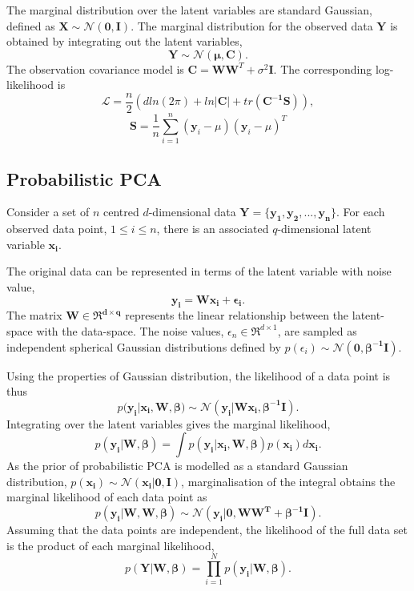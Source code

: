 \documentclass[ %
                    author={Dillon Keith Diep},
                supervisor={Dr. Carl Henrik Ek},
                    degree={MEng},
                     title={Assisted Content Generation for 3D Hair Geometry},
                  subtitle={[INCOMPLETE DRAFT, NOT FOR SUBMISSION]},
                      type={Research},
                      year={2014} ]{dissertation}
\begin{document}
The marginal distribution over the latent variables are standard Gaussian, defined as $\mathbf{X\sim\mathcal{N}(0,I)}$. The marginal distribution for the observed data $\mathbf{Y}$ is obtained by integrating out the latent variables,
$$\mathbf{Y}\sim\mathcal{N}\mathbf{(\mu,C)}.$$
The observation covariance model is $\mathbf{C=WW}^T+\sigma^2\mathbf{I}$. The corresponding log-likelihood is
\begin{equation} \label{ppca:loglikelihood}
	\mathcal{L}=\frac{n}{2}(d ln(2\pi)+ln|\mathbf{C}|+tr(\mathbf{C^{-1}S})),
\end{equation}
$$\mathbf{S}=\frac{1}{n}\sum^n_{i=1}(\mathbf{y}_i-\mu)(\mathbf{y}_i-\mu)^T$$

\subsection{Probabilistic PCA}
Consider a set of $n$ centred $d$-dimensional data $\mathbf{Y=\{y_1,y_2,...,y_n\}}$.
For each observed data point, $1 \leq i \leq n $, there is an associated $q$-dimensional latent variable $\mathbf{x_i}$.

The original data can be represented in terms of the latent variable with noise value,
$$\mathbf{y_i=Wx_i+\epsilon_i}.$$
The matrix $\mathbf{W \in \Re^{d \times q}}$ represents the linear relationship between the latent-space with the  data-space. The noise values, $\epsilon_n \in \Re^{d \times 1}$, are sampled as independent spherical Gaussian distributions defined by $p(\epsilon_i)\sim\mathcal{N}(\mathbf{0, \beta^{-1}I})$.

Using the properties of Gaussian distribution, the likelihood of a data point is thus
\begin{equation} \label{ppca:likelihood}
p(\mathbf{y_i|x_i,W,\beta)\sim\mathcal{N}(y_i|Wx_i,\beta^{-1}I)}.
\end{equation}
Integrating over the latent variables gives the marginal likelihood,
$$p(\mathbf{y_i|W,\beta})=\int p(\mathbf{y_i|x_i,W,\beta})p(\mathbf{x_i})d\mathbf{x_i}.$$
As the prior of probabilistic PCA is modelled as a standard Gaussian distribution, $p(\mathbf{x_i})\sim\mathcal{N}(\mathbf{x_i|0,I})$,
marginalisation of the integral obtains the marginal likelihood of each data point as
$$p(\mathbf{y_i|W,W,\beta})\sim\mathcal{N}(\mathbf{y_i|0,WW^T+\beta^{-1}I}).$$
Assuming that the data points are independent, the likelihood of the full data set is the product of each marginal likelihood,
$$p(\mathbf{Y|W,\beta})=\prod^N_{i=1} p(\mathbf{y_i|W,\beta}).$$
\end{document}
